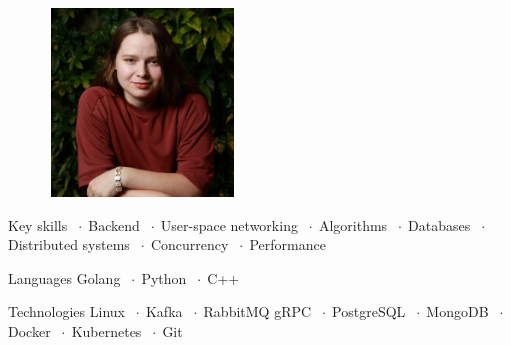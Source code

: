\documentclass[12pt]{cutecv}
\author{Ksenia Syrbulova}
\newcommand{\listbullet}{$\; \cdot \;$}
\begin{document}
\maketitle

\begin{paracol}{2}
\setlength{\columnsep}{2em}
\setlength{\cvsectionverticalskip}{5mm}
\setlength{\cvinfoverticalskip}{5mm}

\begin{leftcolumn}
  \vspace{5mm}
  \begin{figure}[htp]
    \includegraphics[width=5cm, height=5cm]{image.jpg}
\end{figure}

\begin{cvsection}{Key skills}
  \listbullet Backend \listbullet User-space networking \listbullet Algorithms \listbullet Databases
   \listbullet Distributed systems \listbullet Concurrency
   \listbullet Performance \\
\end{cvsection}

\begin{cvsection}{Languages}
  Golang \listbullet Python \listbullet C++
\end{cvsection}

\begin{cvsection}{Technologies}
  Linux \listbullet Kafka \listbullet RabbitMQ
  gRPC \listbullet PostgreSQL \listbullet  MongoDB \listbullet Docker \listbullet Kubernetes
  \listbullet Git \\
\end{cvsection}

\end{leftcolumn}


\end{paracol}
\end{document}
